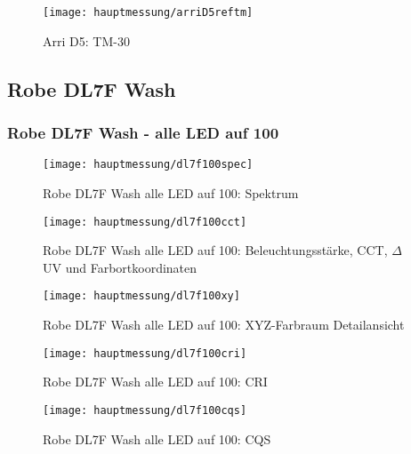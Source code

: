 \documentclass[pagesize,paper=A4,fontsize=12pt,utf8,numbers=noenddot,bibliography=totoc,listof=totoc,DIV=11,BCOR=1mm]{scrreprt}
\begin{document}
\begin{figure}[htp]     %
\centering
\texttt{[image: hauptmessung/arriD5reftm]} 
\caption {Arri D5: TM-30} 
\end{figure}

\subsection{ Robe DL7F Wash}

\subsubsection{ Robe DL7F Wash - alle LED auf 100}

\begin{figure}[htp]     %
\centering
\texttt{[image: hauptmessung/dl7f100spec]} 
\caption { Robe DL7F Wash alle LED auf 100: Spektrum} 
\end{figure}

\begin{figure}[htp]     %
\centering
\texttt{[image: hauptmessung/dl7f100cct]} 
\caption { Robe DL7F Wash alle LED auf 100: Beleuchtungsstärke, CCT, $\Delta$UV und Farbortkoordinaten} 
\end{figure}

\begin{figure}[htp]     %
\centering
\texttt{[image: hauptmessung/dl7f100xy]} 
\caption { Robe DL7F Wash alle LED auf 100: XYZ-Farbraum Detailansicht} 
\end{figure}

\begin{figure}[htp]     %
\centering
\texttt{[image: hauptmessung/dl7f100cri]} 
\caption { Robe DL7F Wash alle LED auf 100: CRI} 
\end{figure}

\begin{figure}[htp]     %
\centering
\texttt{[image: hauptmessung/dl7f100cqs]} 
\caption { Robe DL7F Wash alle LED auf 100: CQS} 
\end{figure}
\end{document}
